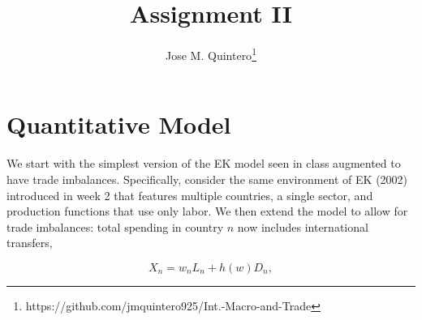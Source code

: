 \documentclass[12pt,oneside,reqno]{article}
\title{Assignment II}
\author{Jose M. Quintero\thanks{https://github.com/jmquintero925/Int.-Macro-and-Trade}}
\begin{document}
\maketitle 
\section{Quantitative Model}

We start with the simplest version of the EK model seen in class augmented to have trade imbalances. Specifically, consider the same environment of EK (2002) introduced in week 2 that features multiple countries, a single sector, and production functions that use only labor. We then extend the model to allow for trade imbalances: total spending in country $n$ now includes international transfers,

\begin{equation*}
X_{n}=w_{n} L_{n}+h(w) D_{n},
\end{equation*}
\end{document}
